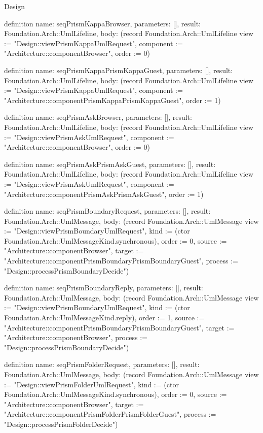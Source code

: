\begin{lexlean}{Design}
\begin{semanticmodule}
definition{
  name: seqPrismKappaBrowser,
  parameters: [],
  result: Foundation.Arch::UmlLifeline,
  body: (record Foundation.Arch::UmlLifeline {view := "Design::viewPrismKappaUmlRequest", component := "Architecture::componentBrowser", order := 0})
}

definition{
  name: seqPrismKappaPrismKappaGuest,
  parameters: [],
  result: Foundation.Arch::UmlLifeline,
  body: (record Foundation.Arch::UmlLifeline {view := "Design::viewPrismKappaUmlRequest", component := "Architecture::componentPrismKappaPrismKappaGuest", order := 1})
}

definition{
  name: seqPrismAskBrowser,
  parameters: [],
  result: Foundation.Arch::UmlLifeline,
  body: (record Foundation.Arch::UmlLifeline {view := "Design::viewPrismAskUmlRequest", component := "Architecture::componentBrowser", order := 0})
}

definition{
  name: seqPrismAskPrismAskGuest,
  parameters: [],
  result: Foundation.Arch::UmlLifeline,
  body: (record Foundation.Arch::UmlLifeline {view := "Design::viewPrismAskUmlRequest", component := "Architecture::componentPrismAskPrismAskGuest", order := 1})
}

definition{
  name: seqPrismBoundaryRequest,
  parameters: [],
  result: Foundation.Arch::UmlMessage,
  body: (record Foundation.Arch::UmlMessage {view := "Design::viewPrismBoundaryUmlRequest", kind := (ctor Foundation.Arch::UmlMessageKind.synchronous), order := 0, source := "Architecture::componentBrowser", target := "Architecture::componentPrismBoundaryPrismBoundaryGuest", process := "Design::processPrismBoundaryDecide"})
}

definition{
  name: seqPrismBoundaryReply,
  parameters: [],
  result: Foundation.Arch::UmlMessage,
  body: (record Foundation.Arch::UmlMessage {view := "Design::viewPrismBoundaryUmlRequest", kind := (ctor Foundation.Arch::UmlMessageKind.reply), order := 1, source := "Architecture::componentPrismBoundaryPrismBoundaryGuest", target := "Architecture::componentBrowser", process := "Design::processPrismBoundaryDecide"})
}

definition{
  name: seqPrismFolderRequest,
  parameters: [],
  result: Foundation.Arch::UmlMessage,
  body: (record Foundation.Arch::UmlMessage {view := "Design::viewPrismFolderUmlRequest", kind := (ctor Foundation.Arch::UmlMessageKind.synchronous), order := 0, source := "Architecture::componentBrowser", target := "Architecture::componentPrismFolderPrismFolderGuest", process := "Design::processPrismFolderDecide"})
}


\end{semanticmodule}
\end{lexlean}
